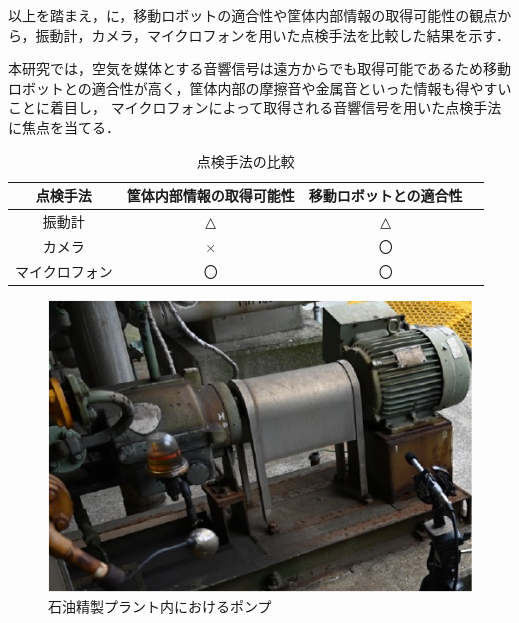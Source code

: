 \documentclass[../main]{subfiles}
\begin{document}
以上を踏まえ，に，移動ロボットの適合性や筐体内部情報の取得可能性の観点から，振動計，カメラ，マイクロフォンを用いた点検手法を比較した結果を示す．

本研究では，空気を媒体とする音響信号は遠方からでも取得可能であるため移動ロボットとの適合性が高く，筐体内部の摩擦音や金属音といった情報も得やすいことに着目し，
マイクロフォンによって取得される音響信号を用いた点検手法に焦点を当てる．



\begin{table}[htbp]
  \centering
  \caption{点検手法の比較}
  \label{tab:synthesis}
  \begin{tabular}{|c|c|c|c|}
  \hline
  点検手法           & 筐体内部情報の取得可能性 & 移動ロボットとの適合性 \\ \hline
  振動計              & △                     & △                   \\ \hline
  カメラ             & ×                     & 〇                   \\ \hline
  マイクロフォン     & 〇                     & 〇                   \\ \hline
  \end{tabular}
\end{table}

\begin{figure}[t]
  \centering
  \includegraphics[keepaspectratio, width=0.8\linewidth]{chap1/pump.pdf}
  \caption{石油精製プラント内におけるポンプ}
  \label{fig:pump}
\end{figure}
\end{document}
